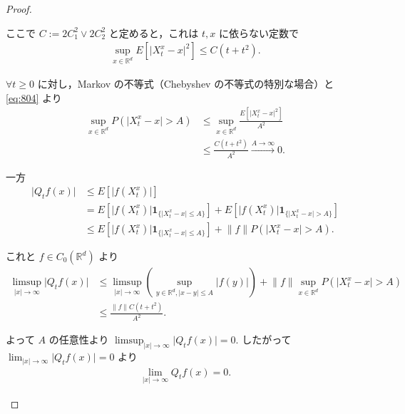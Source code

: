 \documentclass{jsarticle}
\begin{document}
\begin{proof}
\begin{enumerate}[label=(\arabic*)]
\begin{enumerate}[label=(\roman*)]
            ここで $C:=2C_1^2\vee 2C_2^2$ と定めると，これは $t, x$ に依らない定数で
            \setcounter{equation}{3}
            \begin{align}
                \sup_{x\in\mathbb{R}^d}E[\lvert X_{t}^{x}-x\rvert^2]
                \le C(t+t^2).
                \label{eq:804}
            \end{align}

            $\forall t\ge0$ に対し，Markov の不等式（Chebyshev の不等式の特別な場合）と \eqref{eq:804} より
            \begin{align}
                \sup_{x\in\mathbb{R}^d}P(\lvert X_{t}^{x}-x\rvert>A)
                &\le \sup_{x\in\mathbb{R}^d}\frac{E[\lvert X_{t}^{x}-x\rvert^2]}{A^2} \\
                &\le \frac{C(t+t^2)}{A^2}\xrightarrow{A\to\infty}0.
            \end{align}

            一方
            \begin{align}
                \lvert Q_{t}f(x)\rvert
                &\le E[\lvert f(X_{t}^{x})\rvert] \\
                &= E[\lvert f(X_{t}^{x})\rvert\bm{1}_{\{\lvert X_{t}^{x}-x\rvert\le A\}}]
                + E[\lvert f(X_{t}^{x})\rvert\bm{1}_{\{\lvert X_{t}^{x}-x\rvert>A\}}] \\
                &\le E[\lvert f(X_{t}^{x})\rvert\bm{1}_{\{\lvert X_{t}^{x}-x\rvert\le A\}}]
                + \lVert f\rVert P(\lvert X_{t}^{x}-x\rvert>A).
            \end{align}

            これと $f\in C_{0}(\mathbb{R}^d)$ より
            \begin{align}
                \limsup_{\lvert x\rvert\to\infty}\lvert Q_{t}f(x)\rvert
                &\le \limsup_{\lvert x\rvert\to\infty}(\sup_{y\in\mathbb{R}^d, \lvert x-y\rvert\le A}\lvert f(y)\rvert)
                + \lVert f\rVert \sup_{x\in\mathbb{R}^d}P(\lvert X_{t}^{x}-x\rvert>A) \\
                &\le \frac{\lVert f\rVert C(t+t^2)}{A^2}.
            \end{align}

            よって $A$ の任意性より $\limsup_{\lvert x\rvert\to\infty}\lvert Q_{t}f(x)\rvert=0.$
            したがって $\lim_{\lvert x\rvert\to\infty}\lvert Q_{t}f(x)\rvert=0$ より 
            \begin{align}
                \lim_{\lvert x\rvert\to\infty}Q_{t}f(x)=0.
            \end{align}


\end{enumerate}
\end{enumerate}
\end{proof}
\end{document}
